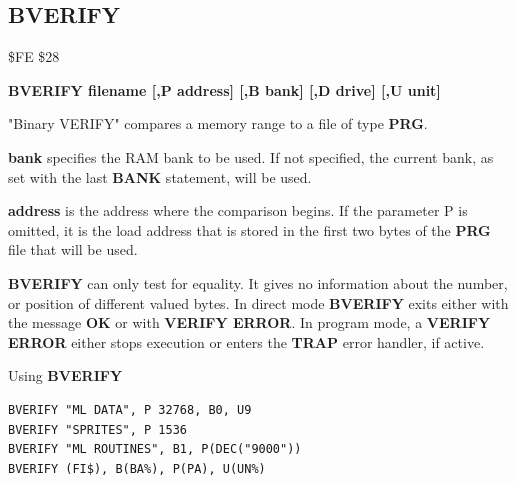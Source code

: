 
\newpage
\subsection{BVERIFY}
\begin{description}[leftmargin=2cm,style=nextline]
\item [Token:] \$FE \$28
\item [Format:] {\bf BVERIFY filename [,P address]
                [,B bank] [,D drive] [,U unit] }
\item [Usage:]
   "Binary VERIFY" compares a memory range to
   a file of type {\bf PRG}.

   \filenamedefinition

   {\bf bank} specifies the RAM bank to be used.
   If not specified, the current bank, as set with the last
   {\bf BANK} statement, will be used.

   {\bf address} is the address where the comparison begins.
   If the parameter P is omitted, it is the load address
   that is stored in the first two bytes of the {\bf PRG} file that will be used.

   \drivedefinition

   \unitdefinition

\item [Remarks:]
   {\bf BVERIFY} can only test for equality. It gives no information
   about the number, or position of different valued bytes.
   In direct mode {\bf BVERIFY} exits either with the message {\bf OK}
   or with {\bf VERIFY ERROR}. In program mode, a {\bf VERIFY ERROR}
   either stops execution or enters the {\bf TRAP} error handler,
   if active.

\item [Examples:] Using {\bf BVERIFY}
\begin{tcolorbox}[colback=black,coltext=white]
\verbatimfont{\codefont}
\begin{verbatim}
BVERIFY "ML DATA", P 32768, B0, U9
BVERIFY "SPRITES", P 1536
BVERIFY "ML ROUTINES", B1, P(DEC("9000"))
BVERIFY (FI$), B(BA%), P(PA), U(UN%)
\end{verbatim}
\end{tcolorbox}
\end{description}


\newpage
